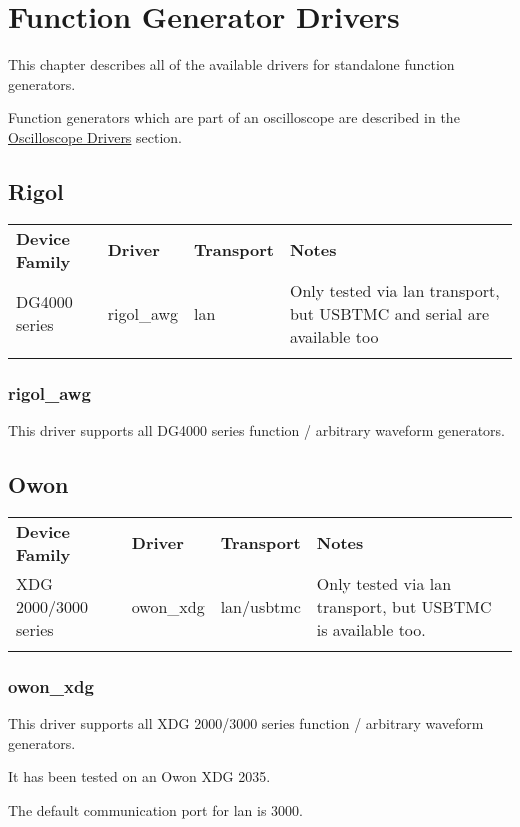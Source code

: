 \chapter{Function Generator Drivers}
\label{sec:funcgen-drivers}

This chapter describes all of the available drivers for standalone function generators.

Function generators which are part of an oscilloscope are described in the \hyperref[sec:scope-drivers]{Oscilloscope
Drivers} section.

\section{Rigol}

\begin{tabularx}{16cm}{lllX}
\thickhline
\textbf{Device Family} & \textbf{Driver} & \textbf{Transport} & \textbf{Notes} \\
\thickhline
DG4000 series & rigol\_awg & lan & Only tested via lan transport, but USBTMC and serial are available too\\
\thickhline
\end{tabularx}

\subsection{rigol\_awg}

This driver supports all DG4000 series function / arbitrary waveform generators.

\section{Owon}

\begin{tabularx}{16cm}{lllX}
\thickhline
\textbf{Device Family} & \textbf{Driver} & \textbf{Transport} & \textbf{Notes} \\
\thickhline
XDG 2000/3000 series & owon\_xdg & lan/usbtmc & Only tested via lan transport, but USBTMC is available too.\\
\thickhline
\end{tabularx}

\subsection{owon\_xdg}

This driver supports all XDG 2000/3000 series function / arbitrary waveform generators.

It has been tested on an Owon XDG 2035.

The default communication port for lan is 3000.

